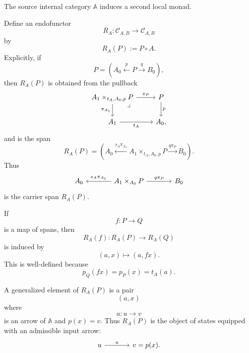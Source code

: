The source internal category \(\mathbb A\) induces a second local monad.

\begin{definition}
\label{def:input-processing-endofunctor}
    Define an endofunctor
    \[
        R_A:\mathcal C_{A,B}\to\mathcal C_{A,B}
    \]
    by
    \[
        R_A(P):=P\circ A.
    \]
    Explicitly, if
    \[
        P=
        \left(
            A_0
            \xleftarrow{p}
            P
            \xrightarrow{q}
            B_0
        \right),
    \]
    then \(R_A(P)\) is obtained from the pullback
    \[
        \begin{tikzcd}
                A_1\times_{t_A,A_0,p}P
                    \arrow[r, "\pi_P"]
                    \arrow[d, "\pi_{A_1}"']
                    \arrow[dr, phantom, "\lrcorner", very near start]
            &
                P 
                    \arrow[d, "p"]
            \\
                A_1 
                    \arrow[r, "t_A"']
            &
                A_0,
        \end{tikzcd}
    \]
    and is the span
    \[
        R_A(P)
        =
        \left(
            A_0
            \xleftarrow{s_A\pi_{A_1}}
            A_1\times_{t_A,A_0,p}P
            \xrightarrow{q\pi_P}
            B_0
        \right).
    \]
    Thus
    \[
        \begin{tikzcd}[column sep=large]
                A_0
            &
                A_1\times_{A_0}P
                    \arrow[l, "s_A\pi_{A_1}"']
                    \arrow[r, "q\pi_P"]
            &
                B_0
        \end{tikzcd}
    \]
    is the carrier span \(R_A(P)\).

    If
    \[
        f:P\to Q
    \]
    is a map of spans, then
    \[
        R_A(f):R_A(P)\to R_A(Q)
    \]
    is induced by
    \[
        (a,x)\longmapsto(a,fx).
    \]
    This is well-defined because
    \[
        p_Q(fx)=p_P(x)=t_A(a).
    \]
\end{definition}

A generalized element of \(R_A(P)\) is a pair
\[
    (a,x)
\]
where
\[
    a:u\to v
\]
is an arrow of \(\mathbb A\) and \(p(x)=v\). Thus \(R_A(P)\) is the object of states equipped with an admissible input arrow:
\[
    \begin{tikzcd}[column sep=large]
            u 
                \arrow[r, "a"] 
        & 
            v=p(x).
    \end{tikzcd}
\]

